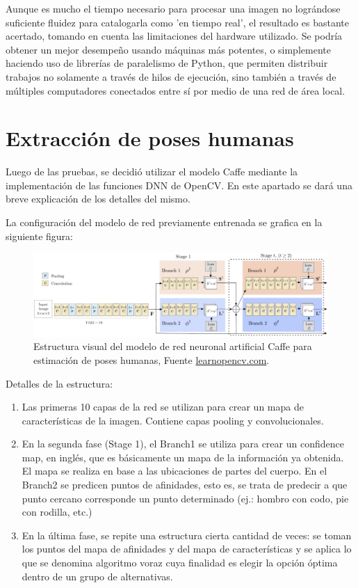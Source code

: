 \documentclass[a4paper,12pt,oneside,spanish]{book}
\begin{document}
Aunque es mucho el tiempo necesario para procesar una imagen no lográndose suficiente fluidez para catalogarla como 'en tiempo real', el resultado es bastante acertado, tomando en cuenta las limitaciones del hardware utilizado. Se podría obtener un mejor desempeño usando máquinas más potentes, o simplemente haciendo uso de librerías de paralelismo de Python, que permiten distribuir trabajos no solamente a través de hilos de ejecución, sino también a través de múltiples computadores conectados entre sí por medio de una red de área local.\par

\newpage
\section{Extracción de poses humanas}\label{extraccionpose}
Luego de las pruebas, se decidió utilizar el modelo Caffe mediante la implementación de las funciones DNN de OpenCV. En este apartado se dará una breve explicación de los detalles del mismo.\par

La configuración del modelo de red previamente entrenada se grafica en la siguiente figura:
\begin{figure}[h!]
	\includegraphics[width=460pt]{Imagenes/network_pose1.jpg}
	\centering	
	\caption{Estructura visual del modelo de red neuronal artificial Caffe para estimación de poses humanas, Fuente \url{learnopencv.com}.}
	\label{fig:network_pose1}
\end{figure}	

Detalles de la estructura:
\begin{enumerate}
	\item Las primeras 10 capas de la red se utilizan para crear un mapa de características de la imagen. Contiene capas pooling y convolucionales.
	\item En la segunda fase (Stage 1), el Branch1 se utiliza para crear un confidence map, en inglés, que es básicamente un mapa de la información ya obtenida. El mapa se realiza en base a las ubicaciones de partes del cuerpo. En el Branch2 se predicen puntos de afinidades, esto es, se trata de predecir a que punto cercano corresponde un punto determinado (ej.: hombro con codo, pie con rodilla, etc.)
	\item En la última fase, se repite una estructura cierta cantidad de veces: se toman los puntos del mapa de afinidades y del mapa de características y se aplica lo que se denomina algoritmo voraz cuya finalidad es elegir la opción óptima dentro de un grupo de alternativas.
\end{enumerate}
\end{document}
